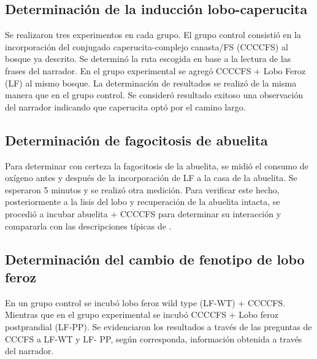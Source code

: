 \documentclass[fleqn,10pt]{AmateCodex} %
\begin{document}
\subsection{Determinación de la inducción lobo-caperucita}
Se realizaron tres experimentos en cada grupo. 
El grupo control consistió en la incorporación del conjugado caperucita-complejo canasta/FS (CCCCFS) al bosque ya descrito. Se determinó la ruta escogida en base a la lectura de las frases del narrador. En el grupo experimental se agregó CCCCFS + Lobo Feroz (LF) al mismo bosque. 
La determinación de resultados se realizó de la misma manera que en el grupo control. Se consideró resultado exitoso una observación del narrador indicando que caperucita optó por el camino largo.

\subsection{Determinación de fagocitosis de abuelita}
Para determinar con certeza la fagocitosis de la abuelita, se midió el consumo de oxígeno antes y después de la incorporación de LF a la casa de la abuelita. Se esperaron 5 minutos y se realizó otra medición. Para verificar este hecho, posteriormente a la lisis del lobo y recuperación de la abuelita intacta, se procedió a incubar abuelita + CCCCFS para determinar su interacción y compararla con las descripciones típicas de \cite{Guardabosques01}.

\subsection{Determinación del cambio de fenotipo de lobo
feroz}
En un grupo control se incubó lobo feroz wild type
(LF-WT) + CCCCFS. Mientras que en el grupo
experimental se incubó CCCCFS + Lobo feroz
postprandial (LF-PP). Se evidenciaron los resultados
a través de las preguntas de CCCFS a LF-WT y LF-
PP, según corresponda, información obtenida a
través del narrador.
\end{document}
